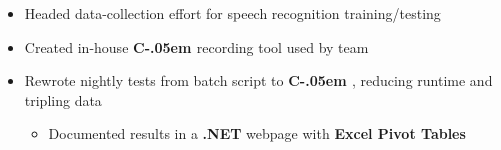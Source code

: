 \documentclass[
	letterpaper,
	 subsectioncolor=orange,
	itemtextcolor=charcoal,
	titletextcolor=arsenic,
	sidebarwidth=0.28\paperwidth,
	topbottommargin=0.03\paperheight,
	leftrightmargin=24pt,
]{clsFiles/fortysecondscv}
\newcommand{\csharp}{\small{\settoheight{\dimen0}{C}C\kern-.05em \resizebox{!}{\dimen0}{\raisebox{\depth}{\#}}}}
\begin{document}
\begin{cvtable}[1]
{\begin{itemize}
			\item Headed data-collection effort for speech recognition training/testing
			\item Created in-house \textbf{\csharp} recording tool used by team
			\item Rewrote nightly tests from batch script to \textbf{\csharp}, reducing runtime and tripling data
			\begin{itemize}[nosep, left=2pt]
				\item Documented results in a \textbf{\footnotesize{.NET}} webpage with \textbf{Excel Pivot Tables}
			\end{itemize}
		\end{itemize}
	}
\end{cvtable}


\begin{cvtable}[1.5]
\end{cvtable}
\end{document}

